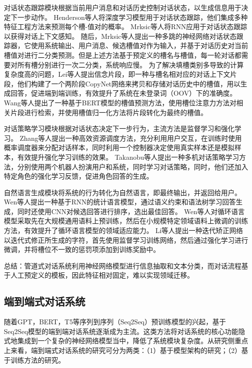 对话状态跟踪模块根据当前用户消息和对话历史控制对话状态，以生成信息用于决定下一步动作。
Henderson等人\cite{DBLP:conf/sigdial/HendersonTY13}将深度学习模型用于对话状态跟踪，他们集成多种特征工程方法来预测每个槽-值对的概率。
Mrksic等人\cite{DBLP:conf/acl/MrksicSTGSVWY15}将RNN应用于对话状态跟踪以获得对话上下文感知。
随后，Mrksic等人\cite{DBLP:conf/acl/MrksicSWTY17}提出一种多跳的神经网络对话状态跟踪器，它使用系统输出、用户消息、候选槽值对作为输入，并基于对话历史对当前槽值对进行二分类预测。但是上述方法基于预定义的槽名与槽值，每一轮对话都需要对所有槽分别进行一次二分类，系统响应慢。
为了解决填槽类别多导致的计算复杂度高的问题，Lei等人\cite{DBLP:conf/acl/KanHLJRY18}提出信念片段，即一种与槽名相对应的对话上下文片段，他们构建了一个两阶段CopyNet网络来拷贝和存储对话历史中的槽值，用以生成回答，促进端到端训练，有效提升了系统在未登录词（OOV）下的准确度。
Wang等人\cite{DBLP:conf/emnlp/WangGZ20}提出了一种基于BERT模型的槽值预测方法，使用槽位注意力方法对相关片段进行检索，并使用槽值归一化方法将片段转化为最终的槽值。

对话策略学习模块根据对话状态决定下一步行为，主流方法是监督学习和强化学习。
Zhang等人\cite{DBLP:conf/acl/ZhangLGC19}提出一种高效资源调度方法，充分利用用户交互，在训练时使用概率调度器来分配对话样本，同时利用一个控制器决定使用真实样本还是模拟样本，有效提升强化学习训练的效果。
Takanobu等人\cite{DBLP:conf/acl/TakanobuLH20}提出一种多机对话策略学习方法，分别使用两个机器人扮演用户和系统，同时学习对话策略，同时，他们还加入特定角色的强化学习反馈，促进角色回答的生成。

自然语言生成模块将系统的行为转化为自然语言，即最终输出，并返回给用户。
Wen等人\cite{DBLP:conf/sigdial/WenGKMSVY15}提出一种基于RNN的统计语言模型，通过语义约束和语法树学习回答生成，同时还使用CNN对候选回答进行排序，选出最佳回答。
Wen等人\cite{DBLP:conf/naacl/WenGMRSVY16}对循环语言模型采取先在大规模通用语料上预训练，然后在小规模特定领域语料上微调的训练方法，有效提升了循环语言模型的领域适应能力。
Li等人\cite{DBLP:conf/acl/LiYQCLL20}提出一种迭代矫正网络以迭代式修正所生成的字符，首先使用监督学习训练网络，然后通过强化学习进行微调，并将槽位不一致的惩罚项添加到训练奖励中。

总结：管道式对话系统利用神经网络模型进行信息抽取和文本分类，而对话流程基于人工预定义的模板，因此特征相对固定，难以实现领域迁移。

\subsection{端到端式对话系统}

随着GPT\cite{DBLP:conf/nips/BrownMRSKDNSSAA20}，BERT\cite{DBLP:conf/naacl/DevlinCLT19}，T5\cite{DBLP:journals/jmlr/RaffelSRLNMZLL20}等序列到序列（Seq2Seq）预训练模型的兴起，基于Seq2Seq模型的端到端对话系统逐渐成为主流。这类方法将对话系统的核心功能隐式地集成到一个复杂的神经网络模型当中，降低了系统模块复杂度。从研究侧重点上来看，端到端式对话系统的研究可分为两类：（1）基于模型架构的研究；（2）基于训练方法的研究。

